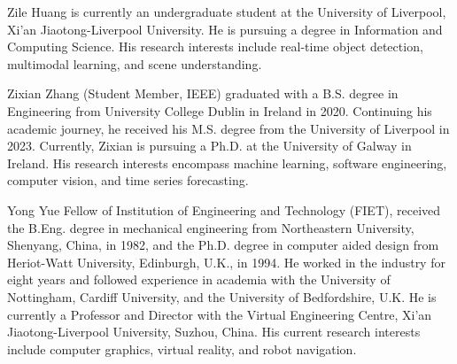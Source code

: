 \documentclass[lettersize,journal]{IEEEtran}
\begin{document}
\vskip -1cm
\begin{IEEEbiography}
{Zile Huang} is currently an undergraduate student at the University of Liverpool, Xi'an Jiaotong-Liverpool University. He is pursuing a degree in Information and Computing Science. His research interests include real-time object detection, multimodal learning, and scene understanding.
\end{IEEEbiography}
\vskip -1cm
\begin{IEEEbiography}
{Zixian Zhang} (Student Member, IEEE) graduated with a B.S. degree in Engineering from University College Dublin in Ireland in 2020. Continuing his academic journey, he received his M.S. degree from the University of Liverpool in 2023. Currently, Zixian is pursuing a Ph.D. at the University of Galway in Ireland. His research interests encompass machine learning, software engineering, computer vision, and time series forecasting.
\end{IEEEbiography}
\vskip -1cm
\begin{IEEEbiography}
{Yong Yue}
Fellow of Institution of Engineering and Technology (FIET), received the B.Eng. degree in mechanical engineering from Northeastern University, Shenyang, China, in 1982, and the Ph.D. degree in computer aided design from Heriot-Watt University, Edinburgh, U.K., in 1994. He worked in the industry for eight years and followed experience in academia with the University of Nottingham, Cardiff University, and the University of Bedfordshire, U.K. He is currently a Professor and Director with the Virtual Engineering Centre, Xi'an Jiaotong-Liverpool University, Suzhou, China. His current research interests include computer graphics, virtual reality, and robot navigation.
\end{IEEEbiography}
\vspace{-1cm}
\end{document}
